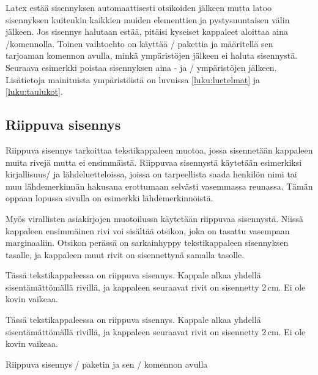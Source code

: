 Latex estää sisennyksen automaattisesti otsikoiden jälkeen mutta latoo
sisennyksen kuitenkin kaikkien muiden elementtien ja pystysuuntaisen
välin jälkeen. Jos sisennys halutaan estää, pitäisi kyseiset kappaleet
aloittaa aina \-/komennolla. Toinen vaihtoehto on
käyttää \-/ pakettia ja
määritellä sen tarjoaman komennon avulla, minkä ympäristöjen jälkeen ei
haluta sisennystä. Seuraava esimerkki poistaa sisennyksen aina
- ja \-/ ympäristöjen jälkeen.
Lisätietoja mainituista ympäristöistä on luvuissa \ref{luku:luetelmat}
ja \ref{luku:taulukot}.

\begin{koodilohkosis}
\end{koodilohkosis}

\subsection{Riippuva sisennys}

Riippuva sisennys tarkoittaa tekstikappaleen muotoa, jossa sisennetään
kappaleen muita rivejä mutta ei ensimmäistä. Riippuvaa sisennystä
käytetään esimerkiksi kirjallisuus\-/{} ja lähdeluetteloissa, joissa on
tarpeellista saada henkilön nimi tai muu lähdemerkinnän hakusana
erottumaan selvästi vasemmassa reunassa. Tämän oppaan lopussa sivulla
\pageref{luku:kirjallisuutta} on esimerkki lähdemerkinnöistä.

Myös virallisten asiakirjojen muotoilussa käytetään riippuvaa
sisennystä. Niissä kappaleen ensimmäinen rivi voi sisältää otsikon, joka
on tasattu vasempaan marginaaliin. Otsikon perässä on sarkainhyppy
tekstikappaleen sisennyksen tasalle, ja kappaleen muut rivit on
sisennettynä samalla tasolle.

\begin{esimerkki*}
  \komentoi{,}

\begin{koodilohko}
  Tässä tekstikappaleessa on riippuva sisennys. Kappale
  alkaa yhdellä sisentämättömällä rivillä, ja kappaleen seuraavat rivit
  on sisennetty 2\,cm. Ei ole kovin vaikeaa.
\end{koodilohko}
\begin{tulos}
  Tässä tekstikappaleessa on riippuva sisennys. Kappale
  alkaa yhdellä sisentämättömällä rivillä, ja kappaleen seuraavat rivit
  on sisennetty 2\,cm. Ei ole kovin vaikeaa.
\end{tulos}
\caption{Riippuva sisennys \-/ paketin ja sen
  \-/ komennon avulla}
\label{esim:riippuva_sis_hangpara}
\end{esimerkki*}

